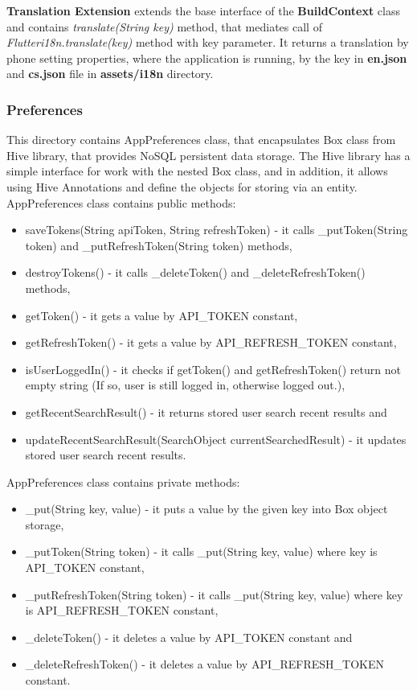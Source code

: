 \textbf{Translation Extension} extends the base interface of the \textbf{BuildContext} class and contains \textit{translate(String key)} method, that mediates call of \textit{Flutteri18n.translate(key)} method with key parameter.
It returns a translation by phone setting properties, where the application is running, by the key in  \textbf{en.json} and \textbf{cs.json} file in \textbf{assets/i18n} directory.


\subsubsection{Preferences}\label{subsubsec:preferences}
This directory contains AppPreferences class, that encapsulates Box class from Hive library, that provides NoSQL persistent data storage.
The Hive library has a simple interface for work with the nested Box class, and in addition, it allows using Hive Annotations and define the objects for storing via an entity.
AppPreferences class contains public methods:
\begin{itemize}
    \item saveTokens(String apiToken, String refreshToken) - it calls \_putToken(String token) and \_putRefreshToken(String token) methods,
    \item destroyTokens() - it calls \_deleteToken() and \_deleteRefreshToken() methods,
    \item getToken() - it gets a value by API\_TOKEN constant,
    \item getRefreshToken() - it gets a value by API\_REFRESH\_TOKEN constant,
    \item isUserLoggedIn() - it checks if getToken() and getRefreshToken() return not empty string (If so, user is still logged in, otherwise logged out.),
    \item getRecentSearchResult() - it returns stored user search recent results and
    \item updateRecentSearchResult(SearchObject currentSearchedResult) - it updates stored user search recent results.
\end{itemize}
AppPreferences class contains private methods:
\begin{itemize}
    \item \_put(String key, value) - it puts a value by the given key into Box object storage,
    \item \_putToken(String token) - it calls \_put(String key, value) where key is API\_TOKEN constant,
    \item \_putRefreshToken(String token) - it calls \_put(String key, value) where key is API\_REFRESH\_TOKEN constant,
    \item \_deleteToken() - it deletes a value by API\_TOKEN constant and
    \item \_deleteRefreshToken() - it deletes a value by API\_REFRESH\_TOKEN constant.
\end{itemize}
